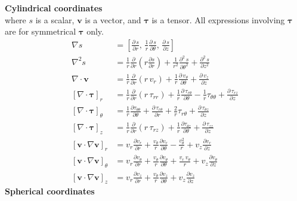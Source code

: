 \begin{datasheet}
\pagebreak
{\bf Cylindrical coordinates}\\
where $s$ is a scalar, $\bm{v}$ is a vector, and $\bm{\tau}$ is a
tensor. All expressions involving $\bm{\tau}$ are for symmetrical
$\bm{\tau}$ only.
\begin{align*}
  \nabla s &= \left[\frac{\partial\,s}{\partial r},\,
    \frac{1}{r}\frac{\partial\,s}{\partial \theta},\,
    \frac{\partial\,s}{\partial z}\right]
  \\
  \nabla^2 s &=\frac{1}{r}\frac{\partial}{\partial
    r}\left(r\frac{\partial s}{\partial r}\right) +
  \frac{1}{r^2}\frac{\partial^2\,s}{\partial \theta^2}+
  \frac{\partial^2\,s}{\partial z^2}
  \\
  \nabla\cdot\bm{v} &= \frac{1}{r}\frac{\partial}{\partial r}\left(r\,
    v_r\right) + \frac{1}{r}\frac{\partial\,v_\theta}{\partial
    \theta}+ \frac{\partial\,v_z}{\partial z}
  \\
  \left[\nabla \cdot \bm{\tau}\right]_r &=
  \frac{1}{r}\frac{\partial}{\partial r}\left(r\,\tau_{rr}\right) +
  \frac{1}{r}\frac{\partial\, \tau_{r\theta}}{\partial \theta} -
  \frac{1}{r} \tau_{\theta\theta} + \frac{\partial\,
    \tau_{rz}}{\partial z}
  \\
  \left[\nabla \cdot \bm{\tau}\right]_\theta &=
  \frac{1}{r}\frac{\partial \tau_{\theta\theta}}{\partial \theta} +
  \frac{\partial\, \tau_{r\theta}}{\partial r} + \frac{2}{r}
  \tau_{r\theta} + \frac{\partial\, \tau_{\theta z}}{\partial z}
  \\
  \left[\nabla \cdot \bm{\tau}\right]_z &= \frac{1}{r}\frac{\partial
  }{\partial r}\left(r\,\tau_{rz}\right) + \frac{1}{r}\frac{\partial
    \tau_{\theta z}}{\partial\theta} + \frac{\partial\, \tau_{z
      z}}{\partial z}
  \\
  \left[\bm{v}\cdot \nabla \bm{v}\right]_r &= v_r \frac{\partial
    v_r}{\partial r} + \frac{v_\theta}{r}\frac{\partial v_r}{\partial
    \theta} - \frac{v_\theta^2}{r}+v_z\frac{\partial v_r}{\partial z}
  \\
  \left[\bm{v}\cdot \nabla \bm{v}\right]_\theta &=
  v_r \frac{\partial v_\theta}{\partial r} + \frac{v_\theta}{r}\frac{\partial v_\theta}{\partial \theta} + \frac{v_r\,v_\theta}{r} + v_z \frac{\partial v_\theta}{\partial z}
  \\
  \left[\bm{v}\cdot \nabla \bm{v}\right]_z &=
  v_r \frac{\partial v_z}{\partial r} + \frac{v_\theta}{r}\frac{\partial v_z}{\partial \theta}+v_z \frac{\partial v_z}{\partial z}
\end{align*}
{\bf Spherical coordinates}\\

\end{datasheet}
